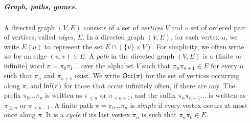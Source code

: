 

\subparagraph*{Graph, paths, games.}A directed graph $(V,E)$ consists of a set of \emph{vertices} $V$ and a set of ordered pair of vertices, called \emph{edges}, $E$. 
In a directed graph $(V, E)$, for each vertex $u$, we write $E(u)$ to represent the set $E \cap (\{u\} \times V)$.
For simplicity, we often write $uv$ for an edge $(u, v)\in E$.
A \emph{path} in the directed graph $(V, E)$ is a (finite or infinite) word $\pi = \pi_0 \pi_1 \dots$ over the alphabet $V$ such that $\pi_n\pi_{n+1} \in E$ for every $n$ such that $\pi_n$ and $\pi_{n+1}$ exist.
We write $\mathsf{Occ}(\pi)$ for the set of vertices occurring along $\pi$, and $\mathsf{Inf}(\pi)$ for those that occur infinitely often, if there are any.
The prefix $\pi_0 \dots \pi_n$ is written as $\pi_{\leq n}$ or $\pi_{< n+1}$, and the suffix $\pi_n \pi_{n+1} \dots$ is written as $\pi_{\geq n}$ or $\pi_{>n-1}$.
A finite path $\pi = \pi_0 \dots \pi_n$ is \emph{simple} if every vertex occurs at most once along $\pi$.
It is a \emph{cycle} if its last vertex $\pi_n$ is such that $\pi_n\pi_0 \in E$.


